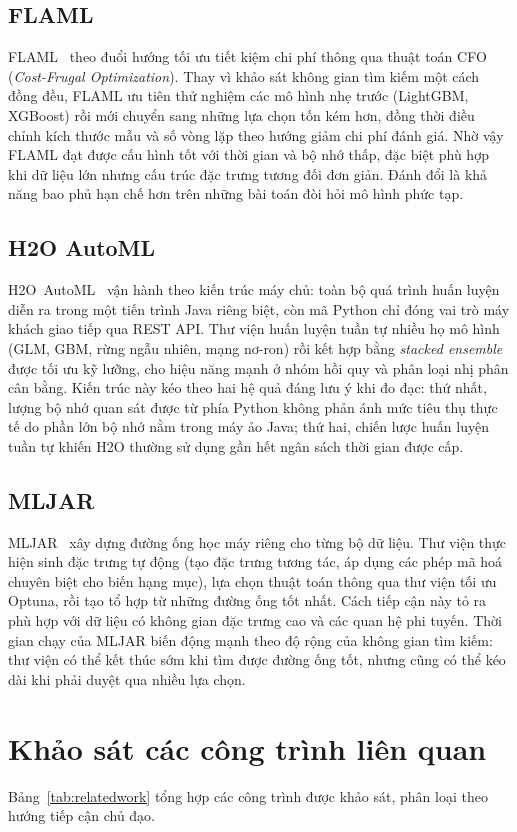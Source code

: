 \subsection{FLAML}
FLAML~\cite{wang2021flaml} theo đuổi hướng tối ưu tiết kiệm chi phí thông qua
thuật toán CFO (\textit{Cost-Frugal Optimization}). Thay vì khảo sát không gian
tìm kiếm một cách đồng đều, FLAML ưu tiên thử nghiệm các mô hình nhẹ trước
(LightGBM, XGBoost) rồi mới chuyển sang những lựa chọn tốn kém hơn, đồng thời điều
chỉnh kích thước mẫu và số vòng lặp theo hướng giảm chi phí đánh giá. Nhờ vậy
FLAML đạt được cấu hình tốt với thời gian và bộ nhớ thấp, đặc biệt phù hợp khi dữ
liệu lớn nhưng cấu trúc đặc trưng tương đối đơn giản. Đánh đổi là khả năng bao phủ
hạn chế hơn trên những bài toán đòi hỏi mô hình phức tạp.

\subsection{H2O AutoML}
H2O~AutoML~\cite{ledell2020h2o} vận hành theo kiến trúc máy chủ: toàn bộ quá trình
huấn luyện diễn ra trong một tiến trình Java riêng biệt, còn mã Python chỉ đóng
vai trò máy khách giao tiếp qua REST API. Thư viện huấn luyện tuần tự nhiều họ mô
hình (GLM, GBM, rừng ngẫu nhiên, mạng nơ-ron) rồi kết hợp bằng \textit{stacked
ensemble} được tối ưu kỹ lưỡng, cho hiệu năng mạnh ở nhóm hồi quy và phân loại nhị
phân cân bằng. Kiến trúc này kéo theo hai hệ quả đáng lưu ý khi đo đạc: thứ nhất,
lượng bộ nhớ quan sát được từ phía Python không phản ánh mức tiêu thụ thực tế do
phần lớn bộ nhớ nằm trong máy ảo Java; thứ hai, chiến lược huấn luyện tuần tự
khiến H2O thường sử dụng gần hết ngân sách thời gian được cấp.

\subsection{MLJAR}
MLJAR~\cite{plonska2021mljar} xây dựng đường ống học máy riêng cho từng bộ dữ
liệu. Thư viện thực hiện sinh đặc trưng tự động (tạo đặc trưng tương tác, áp dụng
các phép mã hoá chuyên biệt cho biến hạng mục), lựa chọn thuật toán thông qua thư
viện tối ưu Optuna, rồi tạo tổ hợp từ những đường ống tốt nhất. Cách tiếp cận này
tỏ ra phù hợp với dữ liệu có không gian đặc trưng cao và các quan hệ phi tuyến.
Thời gian chạy của MLJAR biến động mạnh theo độ rộng của không gian tìm kiếm: thư
viện có thể kết thúc sớm khi tìm được đường ống tốt, nhưng cũng có thể kéo dài khi
phải duyệt qua nhiều lựa chọn.

\section{Khảo sát các công trình liên quan}
\label{sec:conghinhlienquan}
Bảng~\ref{tab:relatedwork} tổng hợp các công trình được khảo sát, phân loại theo
hướng tiếp cận chủ đạo.


